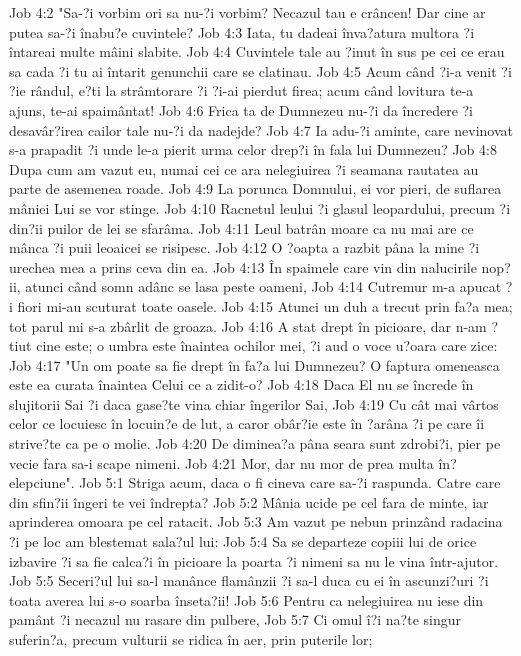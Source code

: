 Job 4:2  "Sa-?i vorbim ori sa nu-?i vorbim? Necazul tau e crâncen! Dar cine ar putea sa-?i înabu?e cuvintele?
Job 4:3  Iata, tu dadeai înva?atura multora ?i întareai multe mâini slabite.
Job 4:4  Cuvintele tale au ?inut în sus pe cei ce erau sa cada ?i tu ai întarit genunchii care se clatinau.
Job 4:5  Acum când ?i-a venit ?i ?ie rândul, e?ti la strâmtorare ?i ?i-ai pierdut firea; acum când lovitura te-a ajuns, te-ai spaimântat!
Job 4:6  Frica ta de Dumnezeu nu-?i da încredere ?i desavâr?irea cailor tale nu-?i da nadejde?
Job 4:7  Ia adu-?i aminte, care nevinovat s-a prapadit ?i unde le-a pierit urma celor drep?i în fala lui Dumnezeu?
Job 4:8  Dupa cum am vazut eu, numai cei ce ara nelegiuirea ?i seamana rautatea au parte de asemenea roade.
Job 4:9  La porunca Domnului, ei vor pieri, de suflarea mâniei Lui se vor stinge.
Job 4:10  Racnetul leului ?i glasul leopardului, precum ?i din?ii puilor de lei se sfarâma.
Job 4:11  Leul batrân moare ca nu mai are ce mânca ?i puii leoaicei se risipesc.
Job 4:12  O ?oapta a razbit pâna la mine ?i urechea mea a prins ceva din ea.
Job 4:13  În spaimele care vin din nalucirile nop?ii, atunci când somn adânc se lasa peste oameni,
Job 4:14  Cutremur m-a apucat ?i fiori mi-au scuturat toate oasele.
Job 4:15  Atunci un duh a trecut prin fa?a mea; tot parul mi s-a zbârlit de groaza.
Job 4:16  A stat drept în picioare, dar n-am ?tiut cine este; o umbra este înaintea ochilor mei, ?i aud o voce u?oara care zice:
Job 4:17  "Un om poate sa fie drept în fa?a lui Dumnezeu? O faptura omeneasca este ea curata înaintea Celui ce a zidit-o?
Job 4:18  Daca El nu se încrede în slujitorii Sai ?i daca gase?te vina chiar îngerilor Sai,
Job 4:19  Cu cât mai vârtos celor ce locuiesc în locuin?e de lut, a caror obâr?ie este în ?arâna ?i pe care îi strive?te ca pe o molie.
Job 4:20  De diminea?a pâna seara sunt zdrobi?i, pier pe vecie fara sa-i scape nimeni.
Job 4:21  Mor, dar nu mor de prea multa în?elepciune".
Job 5:1  Striga acum, daca o fi cineva care sa-?i raspunda. Catre care din sfin?ii îngeri te vei îndrepta?
Job 5:2  Mânia ucide pe cel fara de minte, iar aprinderea omoara pe cel ratacit.
Job 5:3  Am vazut pe nebun prinzând radacina ?i pe loc am blestemat sala?ul lui:
Job 5:4  Sa se departeze copiii lui de orice izbavire ?i sa fie calca?i în picioare la poarta ?i nimeni sa nu le vina într-ajutor.
Job 5:5  Seceri?ul lui sa-l manânce flamânzii ?i sa-l duca cu ei în ascunzi?uri ?i toata averea lui s-o soarba înseta?ii!
Job 5:6  Pentru ca nelegiuirea nu iese din pamânt ?i necazul nu rasare din pulbere,
Job 5:7  Ci omul î?i na?te singur suferin?a, precum vulturii se ridica în aer, prin puterile lor;

